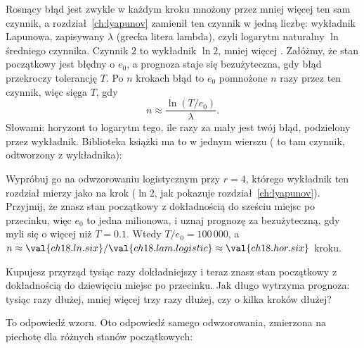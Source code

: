 \noindent
Rosnący błąd jest zwykle w każdym kroku mnożony przez mniej więcej ten sam
czynnik, a rozdział~\ref{ch:lyapunov} zamienił ten czynnik w jedną liczbę: wykładnik
Lapunowa, zapisywany $\lambda$ (grecka litera lambda), czyli logarytm
naturalny $\ln$ średniego czynnika. Czynnik $2$ to wykładnik $\ln 2$, mniej
więcej . Załóżmy, że stan początkowy jest błędny o $e_0$,
a prognoza staje się bezużyteczna, gdy błąd przekroczy tolerancję $T$. Po
$n$ krokach błąd to $e_0$ pomnożone $n$ razy przez ten czynnik, więc sięga
$T$, gdy
\[ n \approx \frac{\ln(T / e_0)}{\lambda}. \]
Słowami: horyzont to logarytm tego, ile razy za mały jest twój błąd,
podzielony przez wykładnik. Biblioteka książki ma to w jednym wierszu
( to tam czynnik, odtworzony z wykładnika):


\noindent
Wypróbuj go na odwzorowaniu logistycznym przy $r = 4$, którego wykładnik ten
rozdział mierzy jako  na krok ($\ln 2$, jak pokazuje
rozdział~\ref{ch:lyapunov}). Przyjmij, że znasz stan początkowy z dokładnością do
sześciu miejsc po przecinku, więc $e_0$ to jedna milionowa, i uznaj prognozę za
bezużyteczną, gdy myli się o więcej niż $T = \num{0.1}$. Wtedy
$T / e_0 = 100\,000$, a $n \approx \val{ch18.ln.six} /
\val{ch18.lam.logistic} \approx \val{ch18.hor.six}$ kroku.

\begin{think}
Kupujesz przyrząd tysiąc razy dokładniejszy i teraz znasz stan początkowy z
dokładnością do dziewięciu miejsc po przecinku. Jak długo wytrzyma
prognoza: tysiąc razy dłużej, mniej więcej trzy razy dłużej, czy o kilka
kroków dłużej?
\end{think}
To odpowiedź wzoru. Oto odpowiedź samego odwzorowania, zmierzona na
piechotę dla  różnych stanów początkowych:




